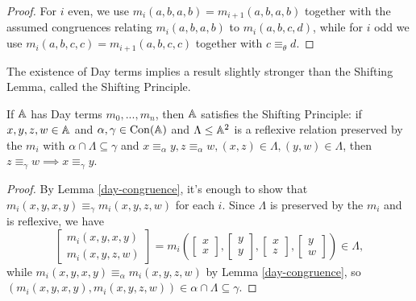 \begin{appendices}
\begin{proof}
For $i$ even, we use $m_i(a,b,a,b) = m_{i+1}(a,b,a,b)$ together with the assumed congruences relating $m_i(a,b,a,b)$ to $m_i(a,b,c,d)$, while for $i$ odd we use $m_i(a,b,c,c) = m_{i+1}(a,b,c,c)$ together with $c \equiv_\theta d$.
\end{proof}

The existence of Day terms implies a result slightly stronger than the Shifting Lemma, called the Shifting Principle.

\begin{lem} If $\mathbb{A}$ has Day terms $m_0, ..., m_n$, then $\mathbb{A}$ satisfies the Shifting Principle: if $x,y,z,w \in \mathbb{A}$ and $\alpha,\gamma \in \operatorname{Con}(\mathbb{A})$ and $\Lambda \le \mathbb{A}^2$ is a reflexive relation preserved by the $m_i$ with $\alpha \cap \Lambda \subseteq \gamma$ and $x \equiv_\alpha y, z\equiv_\alpha w, (x,z)\in \Lambda, (y,w)\in \Lambda$, then $z \equiv_\gamma w \implies x \equiv_\gamma y$.
\begin{center}
\end{center}
\end{lem}
\begin{proof} By Lemma \ref{day-congruence}, it's enough to show that $m_i(x,y,x,y) \equiv_\gamma m_i(x,y,z,w)$ for each $i$. Since $\Lambda$ is preserved by the $m_i$ and is reflexive, we have
\[
\begin{bmatrix} m_i(x,y,x,y)\\ m_i(x,y,z,w)\end{bmatrix} = m_i\left(\begin{bmatrix} x\\ x\end{bmatrix}, \begin{bmatrix} y\\ y\end{bmatrix}, \begin{bmatrix} x\\ z\end{bmatrix}, \begin{bmatrix} y\\ w\end{bmatrix}\right) \in \Lambda,
\]
while $m_i(x,y,x,y) \equiv_\alpha m_i(x,y,z,w)$ by Lemma \ref{day-congruence}, so $(m_i(x,y,x,y),m_i(x,y,z,w)) \in \alpha \cap \Lambda \subseteq \gamma$.
\end{proof}


\end{appendices}
